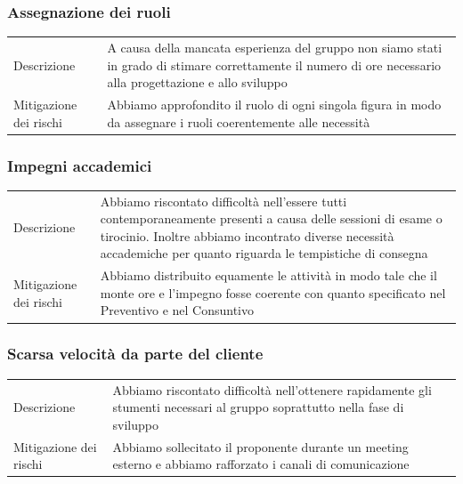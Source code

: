 \documentclass{article}
\begin{document}
\subsubsection{Assegnazione dei ruoli}
\begin{center}
\begin{tabular}{P{10em} P{20em}} 
     Descrizione &  A causa della mancata esperienza del gruppo non siamo stati in grado di stimare correttamente il numero di ore necessario alla progettazione e allo sviluppo\\ 
    Mitigazione dei rischi &  Abbiamo approfondito il ruolo di ogni singola figura in modo da assegnare i ruoli coerentemente alle necessità\\
\end{tabular}
\label{tab:mitruoli}
\end{center}

\subsubsection{Impegni accademici}
\begin{center}
\begin{tabular}{P{10em} P{20em}} 
     Descrizione & Abbiamo riscontato difficoltà nell'essere tutti contemporaneamente presenti a causa delle sessioni di esame o tirocinio. Inoltre abbiamo incontrato diverse necessità accademiche per quanto riguarda le tempistiche di consegna \\ 
    Mitigazione dei rischi & Abbiamo distribuito equamente le attività in modo tale che il monte ore e l'impegno fosse coerente con quanto specificato nel Preventivo e nel Consuntivo  \\
\end{tabular}
\label{tab:mitimpegni}
\end{center}

\subsubsection{Scarsa velocità da parte del cliente}
\begin{center}
\begin{tabular}{P{10em} P{20em}} 
     Descrizione & Abbiamo riscontato difficoltà nell'ottenere rapidamente gli stumenti necessari al gruppo soprattutto nella fase di sviluppo \\ 
    Mitigazione dei rischi & Abbiamo sollecitato il proponente durante un meeting esterno e abbiamo rafforzato i canali di comunicazione \\
\end{tabular}
\label{tab:mitcliente}
\end{center}
\end{document}

